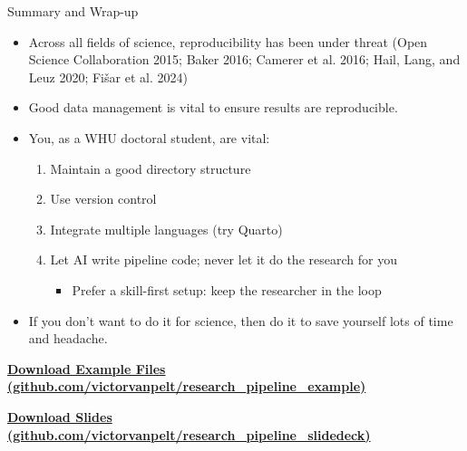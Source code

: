 \documentclass[
  ignorenonframetext,
  aspectratio=169,
]{beamer}
\providecommand{\tightlist}{%
  \setlength{\itemsep}{0pt}\setlength{\parskip}{0pt}}
\begin{document}
\begin{frame}{Summary and Wrap-up}
\label{summary-and-wrap-up}
\begin{itemize}
\tightlist
\item
  Across all fields of science, reproducibility has been under threat
  (Open Science Collaboration 2015; Baker 2016; Camerer et al. 2016;
  Hail, Lang, and Leuz 2020; Fišar et al. 2024)
\item
  Good data management is vital to ensure results are reproducible.
\item
  You, as a WHU doctoral student, are vital:

  \begin{enumerate}
  \tightlist
  \item
    Maintain a good directory structure
  \item
    Use version control
  \item
    Integrate multiple languages (try Quarto)
  \item
    Let AI write pipeline code; never let it do the research for you

    \begin{itemize}
    \tightlist
    \item
      Prefer a skill-first setup: keep the researcher in the loop
    \end{itemize}
  \end{enumerate}
\item
  If you don't want to do it for science, then do it to save yourself
  lots of time and headache.
\end{itemize}

\centering

\href{https://github.com/victorvanpelt/research_pipeline_example}{\textbf{Download
Example Files (github.com/victorvanpelt/research\_pipeline\_example)}}

\href{https://github.com/victorvanpelt/research_pipeline_slidedeck}{\textbf{Download
Slides (github.com/victorvanpelt/research\_pipeline\_slidedeck)}}
\end{frame}
\end{document}
